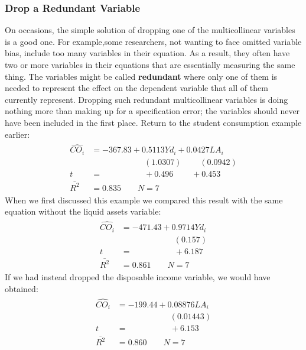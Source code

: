 \documentclass[11pt]{article}
\begin{document}
\subsubsection{Drop a Redundant Variable}
On occasions, the simple solution of dropping one of the multicollinear variables is a good one. For example,some researchers, not wanting to face omitted variable bias, include too many variables in their equation. As a result, they often have two or more variables in their equations that are essentially measuring the same thing. The variables might be called \textbf{redundant} where only one of them is needed to represent the effect on the dependent variable that all of them currently represent. Dropping such redundant multicollinear variables is doing nothing more than making up for a specification error; the variables should never have been included in the first place. Return to the student consumption example earlier:
\begin{align*}
\begin{split}
\widehat{CO_i} &= -367.83 + {0.5113Yd_i} + {0.0427LA_i}\\
&\>\>\>\>\>\>\>\>\>\>\>\>\>\>\>\>\>\>\>\>\>\>\>\>\>\>\>\>\> (1.0307) 
\>\>\>\>\>\>\>\>\>\> (0.0942)\\
t&=\>\>\>\>\>\>\>\>\>\>\>\>\>\>\>\>\>\>\>\>\>\>\> +0.496
\>\>\>\>\>\>\>\>\>\> +0.453\\
\bar{R^2}&= 0.835\quad\quad N=7
\end{split}
\end{align*}
When we first discussed this example we compared this result with the same equation without the liquid assets variable:
\begin{align*}
\begin{split}
\widehat{CO_i} &= -471.43 + {0.9714Yd_i}\\
&\>\>\>\>\>\>\>\>\>\>\>\>\>\>\>\>\>\>\>\>\>\>\>\>\>\>\>\>\> (0.157)\\
t&=\>\>\>\>\>\>\>\>\>\>\>\>\>\>\>\>\>\>\>\>\>\>\> +6.187\\
\bar{R^2}&= 0.861\quad\quad N=7
\end{split}
\end{align*}
If we had instead dropped the disposable income variable, we would have obtained:
\begin{align}
\label{eg8_17}
\begin{split}
\widehat{CO_i} &= -199.44 + {0.08876LA_i}\\
&\>\>\>\>\>\>\>\>\>\>\>\>\>\>\>\>\>\>\>\>\>\>\>\>\>\>\>\>\> (0.01443)\\
t&=\>\>\>\>\>\>\>\>\>\>\>\>\>\>\>\>\>\>\>\>\>\>\> +6.153\\
\bar{R^2}&= 0.860\quad\quad N=7
\end{split}
\end{align}
\end{document}
